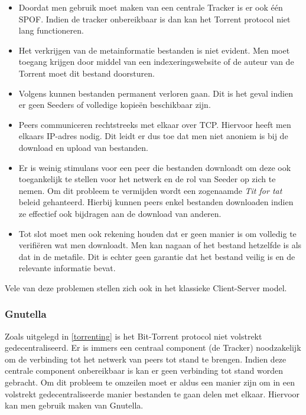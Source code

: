 \begin{itemize}
\item Doordat men gebruik moet maken van een centrale Tracker is er ook één SPOF. Indien de tracker onbereikbaar is dan kan het Torrent protocol niet lang functioneren.\\

\item Het verkrijgen van de metainformatie bestanden is niet evident. Men moet toegang krijgen door middel van een indexeringswebsite of de auteur van de Torrent moet dit bestand doorsturen.\\

\item Volgens \textcite{Thanekar2010} kunnen bestanden permanent verloren gaan. Dit is het geval indien er geen Seeders of volledige kopieën beschikbaar zijn.\\

\item Peers communiceren rechtstreeks met elkaar over TCP. Hiervoor heeft men elkaars IP-adres nodig. Dit leidt er dus toe dat men niet anoniem is bij de download en upload van bestanden.\\

\item Er is weinig stimulans voor een peer die bestanden downloadt om deze ook toegankelijk te stellen voor het netwerk en de rol van Seeder op zich te nemen. Om dit probleem te vermijden wordt een zogenaamde \textit{Tit for tat} beleid gehanteerd. Hierbij kunnen peers enkel bestanden downloaden indien ze effectief ook bijdragen aan de download van anderen.\\

\item Tot slot moet men ook rekening houden dat er geen manier is om volledig te verifiëren wat men downloadt. Men kan nagaan of het bestand hetzelfde is als dat in de metafile. Dit is echter geen garantie dat het bestand veilig is en de relevante informatie bevat. 
\end{itemize}

Vele van deze problemen stellen zich ook in het klassieke Client-Server model.

\subsubsection{Gnutella}
\label{Gnutella}
Zoals uitgelegd in \ref{torrenting} is het Bit-Torrent protocol niet volstrekt gedecentraliseerd. Er is immers een centraal component (de Tracker) noodzakelijk om de verbinding tot het netwerk van peers tot stand te brengen. Indien deze centrale component onbereikbaar is kan er geen verbinding tot stand worden gebracht. Om dit probleem te omzeilen moet er aldus een manier zijn om in een volstrekt gedecentraliseerde manier bestanden te gaan delen met elkaar. Hiervoor kan men gebruik maken van Gnutella.\\

